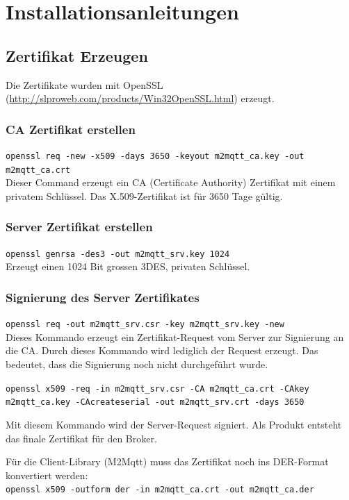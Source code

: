 \chapter{Installationsanleitungen} \label{ch:manual}

\section*{Zertifikat Erzeugen}
Die Zertifikate wurden mit OpenSSL (\url{http://slproweb.com/products/Win32OpenSSL.html}) erzeugt.

\subsection*{CA Zertifikat erstellen}
\lstinline!openssl req -new -x509 -days 3650 -keyout m2mqtt_ca.key -out m2mqtt_ca.crt! \\
Dieser Command erzeugt ein CA (Certificate Authority) Zertifikat mit einem privatem Schlüssel. Das X.509-Zertifikat ist für 3650 Tage gültig.

\subsection*{Server Zertifikat erstellen}
\lstinline!openssl genrsa -des3 -out m2mqtt_srv.key 1024! \\
Erzeugt einen 1024 Bit grossen 3DES, privaten Schlüssel. 

\subsection*{Signierung des Server Zertifikates}
\lstinline!openssl req -out m2mqtt_srv.csr -key m2mqtt_srv.key -new! \\
Dieses Kommando erzeugt ein Zertifikat-Request vom Server zur Signierung an die CA. Durch dieses Kommando wird lediglich der Request erzeugt. Das bedeutet, dass die Signierung noch nicht durchgeführt wurde.

\lstinline!openssl x509 -req -in m2mqtt_srv.csr -CA m2mqtt_ca.crt -CAkey m2mqtt_ca.key -CAcreateserial -out m2mqtt_srv.crt -days 3650!

Mit diesem Kommando wird der Server-Request signiert. Als Produkt entsteht das finale Zertifikat für den Broker.

Für die Client-Library (M2Mqtt) muss das Zertifikat noch ins DER-Format konvertiert werden: \\
\lstinline!openssl x509 -outform der -in m2mqtt_ca.crt -out m2mqtt_ca.der!

